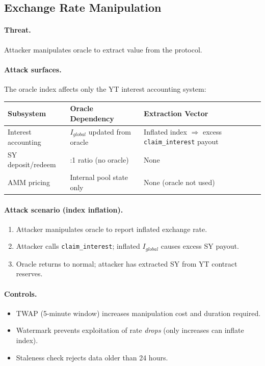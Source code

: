 \subsection{Exchange Rate Manipulation}

\paragraph{Threat.} Attacker manipulates oracle to extract value from the protocol.

\paragraph{Attack surfaces.} The oracle index affects only the YT interest accounting system:

\begin{center}
\begin{tabularx}{\textwidth}{l >{\raggedright\arraybackslash}X l}
\toprule
\textbf{Subsystem} & \textbf{Oracle Dependency} & \textbf{Extraction Vector} \\
\midrule
Interest accounting & $I_{global}$ updated from oracle & Inflated index $\Rightarrow$ excess \texttt{claim\_interest} payout \\
SY deposit/redeem & 1:1 ratio (no oracle) & None \\
AMM pricing & Internal pool state only & None (oracle not used) \\
\bottomrule
\end{tabularx}
\end{center}

\paragraph{Attack scenario (index inflation).}
\begin{enumerate}
\item Attacker manipulates oracle to report inflated exchange rate.
\item Attacker calls \texttt{claim\_interest}; inflated $I_{global}$ causes excess SY payout.
\item Oracle returns to normal; attacker has extracted SY from YT contract reserves.
\end{enumerate}

\paragraph{Controls.}
\begin{itemize}
\item TWAP (5-minute window) increases manipulation cost and duration required.
\item Watermark prevents exploitation of rate \emph{drops} (only increases can inflate index).
\item Staleness check rejects data older than 24 hours.
\end{itemize}

